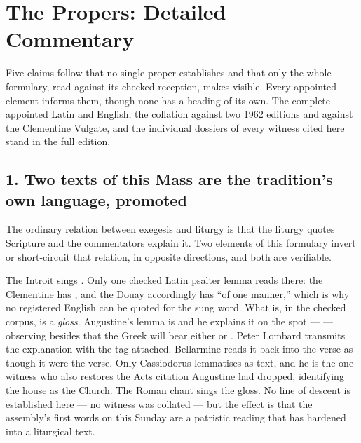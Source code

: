 \section*{The Propers: Detailed Commentary}

Five claims follow that no single proper establishes and that only the whole
formulary, read against its checked reception, makes visible. Every appointed
element informs them, though none has a heading of its own. The complete
appointed Latin and English, the collation against two 1962 editions and
against the Clementine Vulgate, and the individual dossiers of every witness
cited here stand in the full edition.

\subsection*{1. Two texts of this Mass are the tradition's own language, promoted}

The ordinary relation between exegesis and liturgy is that the liturgy quotes
Scripture and the commentators explain it. Two elements of this formulary
invert or short-circuit that relation, in opposite directions, and both are
verifiable.

The Introit sings . Only
one checked Latin psalter lemma reads  there: the Clementine has
, and the Douay accordingly has ``of one manner,'' which is
why no registered English can be quoted for the sung word. What
 is, in the checked corpus, is a \textit{gloss}. Augustine's
lemma is  and he explains it on the spot ---
 --- observing besides that the Greek will
bear either  or . Peter Lombard transmits the
explanation with the tag attached. Bellarmine reads it back into the verse as
though it were the verse. Only Cassiodorus lemmatises  as text,
and he is the one witness who also restores the Acts citation Augustine had
dropped, identifying the house as the Church. The Roman chant sings the gloss.
No line of descent is established here --- no 
witness was collated --- but the effect is that the assembly's first words on this
Sunday are a patristic reading that has hardened into a liturgical text.

